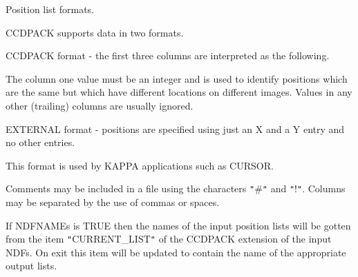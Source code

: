 {{{         \sstitem
         Position list formats.

      }
        CCDPACK supports data in two formats.

        CCDPACK format - the first three columns are interpreted as the
        following.

        The column one value must be an integer and is used to identify
        positions which are the same but which have different locations
        on different images. Values in any other (trailing) columns are
        usually ignored.

        EXTERNAL format - positions are specified using just an X
        and a Y entry and no other entries.

        This format is used by KAPPA applications such as CURSOR.

        Comments may be included in a file using the characters {\tt "}\#{\tt "} and
        {\tt "}!{\tt "}. Columns may be separated by the use of commas or spaces.

        If NDFNAMEs is TRUE then the names of the input position lists
        will be gotten from the item {\tt "}CURRENT\_LIST{\tt "} of the CCDPACK
        extension of the input NDFs. On exit this item will be updated
        to contain the name of the appropriate output lists.
   }
   }
